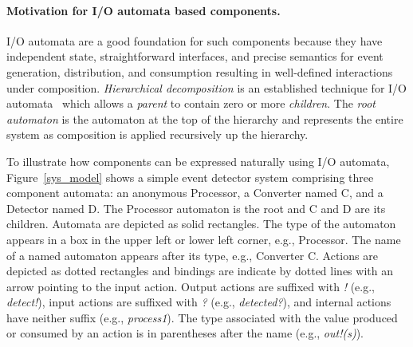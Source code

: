 \paragraph*{Motivation for I/O automata based components.}
I/O automata are a good foundation for such components because they have independent state, straightforward interfaces, and precise semantics for event generation, distribution, and consumption resulting in well-defined interactions under composition.
\emph{Hierarchical decomposition} is an established technique for I/O automata~\cite{lynch1994atomic} which allows a \emph{parent} to contain zero or more \emph{children}.
The \emph{root automaton} is the automaton at the top of the hierarchy and represents the entire system as composition is applied recursively up the hierarchy.

To illustrate how components can be expressed naturally using I/O automata, Figure~\ref{sys_model} shows a simple event detector system comprising three component automata: an anonymous Processor, a Converter named C, and a Detector named D. 
The Processor automaton is the root and C and D are its children.
Automata are depicted as solid rectangles. The type of the automaton appears in a box in the upper left or lower left corner, e.g., Processor.
The name of a named automaton appears after its type, e.g., Converter C.
Actions are depicted as dotted rectangles and bindings are indicate by dotted lines with an arrow pointing to the input action.
Output actions are suffixed with \emph{!} (e.g., \emph{detect!}), input actions are suffixed with \emph{?} (e.g., \emph{detected?}), and internal actions have neither suffix (e.g., \emph{process1}).
The type associated with the value produced or consumed by an action is in parentheses after the name (e.g., \emph{out!(s)}).

